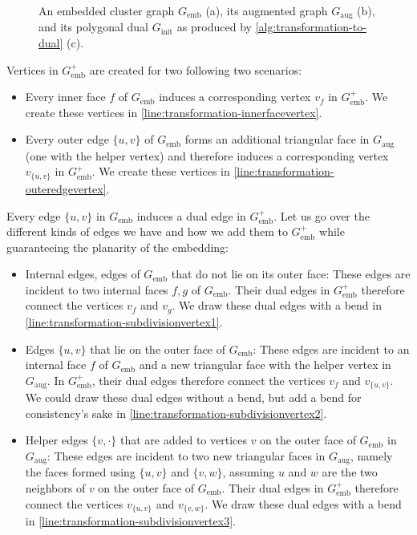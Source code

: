 \begin{figure}[H]
	\caption{An embedded cluster graph $G_\text{emb}$ (a), its augmented graph $G_\text{aug}$ (b), and its polygonal dual $G_\text{init}$ as produced by \cref{alg:transformation-to-dual} (c).}
	\label{fig:transformation-algorithm}
\end{figure}

Vertices in $G_\text{emb}^+$ are created for two following two scenarios:
%
\begin{itemize}
\item Every inner face $f$ of $G_\text{emb}$ induces a corresponding vertex $v_f$ in $G_\text{emb}^+$.
We create these vertices in \cref{line:transformation-innerfacevertex}.
\item Every outer edge $\{u,v\}$ of $G_\text{emb}$ forms an additional triangular face in $G_\text{aug}$ (one with the helper vertex) and therefore induces a corresponding vertex $v_{\{u,v\}}$ in $G_\text{emb}^+$.
We create these vertices in \cref{line:transformation-outeredgevertex}.
\end{itemize}

Every edge $\{u,v\}$ in $G_\text{emb}$ induces a dual edge in $G_\text{emb}^+$.
Let us go over the different kinds of edges we have and how we add them to $G_\text{emb}^+$ while guaranteeing the planarity of the embedding:
%
\begin{itemize}
\item Internal edges, \ie{} edges of $G_\text{emb}$ that do not lie on its outer face:
These edges are incident to two internal faces $f, g$ of $G_\text{emb}$.
Their dual edges in $G_\text{emb}^+$ therefore connect the vertices $v_f$ and $v_g$.
We draw these dual edges with a bend in \cref{line:transformation-subdivisionvertex1}.
\item Edges $\{u,v\}$ that lie on the outer face of $G_\text{emb}$:
These edges are incident to an internal face $f$ of $G_\text{emb}$ and a new triangular face with the helper vertex in $G_\text{aug}$.
In $G_\text{emb}^+$, their dual edges therefore connect the vertices $v_f$ and $v_{\{u,v\}}$.
We could draw these dual edges without a bend, but add a bend for consistency's sake in \cref{line:transformation-subdivisionvertex2}.
\item Helper edges $\{v,\cdot\}$ that are added to vertices $v$ on the outer face of $G_\text{emb}$ in $G_\text{aug}$:
These edges are incident to two new triangular faces in $G_\text{aug}$, namely the faces formed using $\{u,v\}$ and $\{v,w\}$, assuming $u$ and $w$ are the two neighbors of $v$ on the outer face of $G_\text{emb}$.
Their dual edges in $G_\text{emb}^+$ therefore connect the vertices $v_{\{u,v\}}$ and $v_{\{v,w\}}$.
We draw these dual edges with a bend in \cref{line:transformation-subdivisionvertex3}.
\end{itemize}


